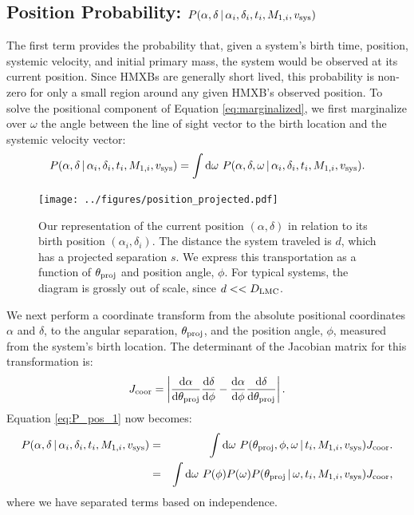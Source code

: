 \documentclass[12pt, preprint]{aastex}
\newcommand{\given}{\,|\,}
\newcommand{\dd}{\mathrm{d}}
\begin{document}
\subsection{Position Probability: $P( \alpha, \delta \given \alpha_i, \delta_i, t_i, M_{1,i}, v_{\rm sys} )$} \label{sec:ra_dec}

The first term provides the probability that, given a system's birth time, position, systemic velocity, and initial primary mass, the system would be observed at its current position. Since HMXBs are generally short lived, this probability is non-zero for only a small region around any given HMXB's observed position. To solve the positional component of Equation \ref{eq:marginalized}, we first marginalize over $\omega$ the angle between the line of sight vector to the birth location and the systemic velocity vector:
\begin{equation}
P(\alpha, \delta \given \alpha_i, \delta_i, t_i, M_{1,i}, v_{\rm sys} ) = \int \dd \omega\ P(\alpha, \delta, \omega \given \alpha_i, \delta_i, t_i, M_{1,i}, v_{\rm sys} ). \label{eq:P_pos_1}
\end{equation}

\begin{figure}[h!]
\begin{center}
\texttt{[image: ../figures/position\_projected.pdf]}
\caption{Our representation of the current position $(\alpha, \delta)$ in relation to its birth position $(\alpha_i, \delta_i)$. The distance the system traveled is $d$, which has a projected separation $s$. We express this transportation as a function of $\theta_{\rm proj}$ and position angle, $\phi$. For typical systems, the diagram is grossly out of scale, since $d << D_{\rm LMC}$.}
\label{fig:position_projection}
\end{center}
\end{figure}


We next perform a coordinate transform from the absolute positional coordinates $\alpha$ and $\delta$, to the angular separation, $\theta_{\rm proj}$, and the position angle, $\phi$, measured from the system's birth location. The determinant of the Jacobian matrix for this transformation is:
\begin{equation}
J_{\rm coor} = \left| \frac{\dd \alpha}{\dd \theta_{\rm proj}} \frac{\dd \delta}{\dd \phi} - \frac{\dd \alpha}{\dd \phi} \frac{\dd \delta}{\dd \theta_{\rm proj}} \right|.
\end{equation}
Equation \ref{eq:P_pos_1} now becomes:
\begin{eqnarray}
P(\alpha, \delta \given \alpha_i, \delta_i, t_i, M_{1,i}, v_{\rm sys} ) &=& \int \dd \omega\ P(\theta_{\rm proj}, \phi, \omega \given t_i, M_{1,i}, v_{\rm sys} ) J_{\rm coor}. \nonumber \\
&=& \int \dd \omega\ P(\phi) P(\omega) P(\theta_{\rm proj} \given \omega,  t_i, M_{1,i}, v_{\rm sys} ) J_{\rm coor}, \label{eq:P_pos_2}
\end{eqnarray}
where we have separated terms based on independence.
\end{document}
